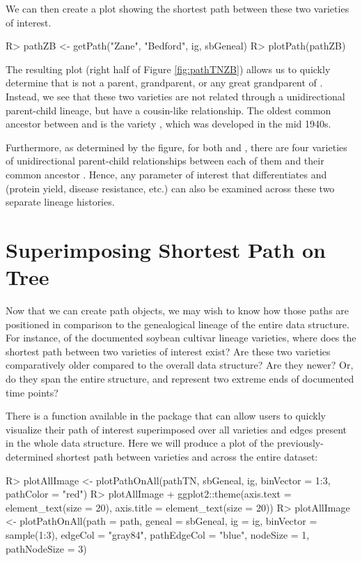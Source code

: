 \documentclass[article,shortnames]{jss}
\begin{document}
We can then create a plot showing the shortest path between these two varieties of interest.

\begin{Code}
R> pathZB <- getPath("Zane", "Bedford", ig, sbGeneal)
R> plotPath(pathZB)
\end{Code}

The resulting plot (right half of Figure \ref{fig:pathTNZB}) allows us to quickly determine that  is not a parent, grandparent, or any great grandparent of . Instead, we see that these two varieties are not related through a unidirectional parent-child lineage, but have a cousin-like relationship. The oldest common ancestor between  and  is the variety , which was developed in the mid 1940s.

Furthermore, as determined by the figure, for both  and , there are four varieties of unidirectional parent-child relationships between each of them and their common ancestor . Hence, any parameter of interest that differentiates  and  (protein yield, disease resistance, etc.) can also be examined across these two separate lineage histories.

\section{Superimposing Shortest Path on Tree}

Now that we can create path objects, we may wish to know how those paths are positioned in comparison to the genealogical lineage of the entire data structure. For instance, of the documented soybean cultivar lineage varieties, where does the shortest path between two varieties of interest exist? Are these two varieties comparatively older compared to the overall data structure? Are they newer? Or, do they span the entire structure, and represent two extreme ends of documented time points?

There is a function available in the  package  that can allow users to quickly visualize their path of interest superimposed over all varieties and edges present in the whole data structure. Here we will produce a plot of the previously-determined shortest path between varieties  and  across the entire dataset:

\begin{Code}
R> plotAllImage <- plotPathOnAll(pathTN, sbGeneal, ig, binVector = 1:3,
  pathColor = "red")
R> plotAllImage + ggplot2::theme(axis.text = element_text(size = 20),
  axis.title = element_text(size = 20))
R> plotAllImage <- plotPathOnAll(path = path, geneal = sbGeneal, ig = ig,
  binVector = sample(1:3), edgeCol = "gray84", pathEdgeCol = "blue", nodeSize
  = 1, pathNodeSize = 3)
\end{Code}
\end{document}

